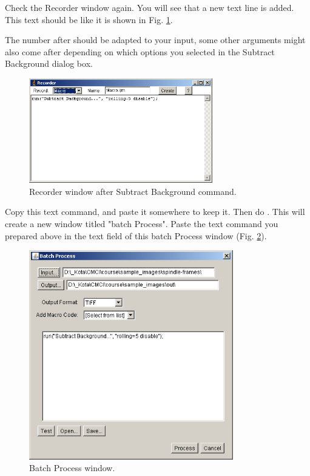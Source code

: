 \begin{indentexercise}{1}
Check the Recorder window again. You will see that a new text line is
added. This text should be like it is shown in Fig. \ref{fig:img73}.

\begin{quote}
\end{quote}

The number after  should be adapted
 to your input, some other arguments might also come after depending on which options you selected in the Subtract Background dialog box. 
\begin{figure}[htbp]
\begin{center}
\includegraphics[width=8cm]{fig/CMCIBasicCourse201102-img73.png}
\caption{ Recorder window after Subtract Background command.}
\label{fig:img73}
\end{center}
\end{figure}

Copy this text command, and paste it somewhere to keep it.
Then do . This will create a new window titled
"batch Process". Paste the text
command you prepared above in the text field of this batch Process
window (Fig. \ref{fig:img74}). 

\begin{figure}[htbp]
\begin{center}
\includegraphics[width=8.881cm,height=9.116cm]{fig/CMCIBasicCourse201102-img74.png}
\caption{ Batch Process window.}
\label{fig:img74}
\end{center}
\end{figure}



\end{indentexercise}
